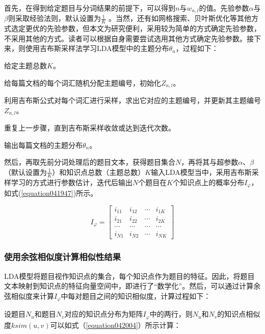 首先，在得到给定题目与分词结果的前提下，可以得到$n$与$w_{n,l}$的值。先验参数$\alpha$与$\beta$则采取经验法则，默认设置为$\frac{1}{K}$ 。当然，还有如网格搜索、贝叶斯优化等其他方式选定更优的先验参数，但本文为研究便利，采用较为简单的方式确定先验参数，不采用其他的方式。读者可以根据自身需要尝试选用其他方式确定先验参数。接下来，则使用吉布斯采样法学习LDA模型中的主题分布$\theta _{n}$，过程如下：

\begin{mgAlgorithm}[吉布采样学习LDA模型过程]
    \item 给定主题总数$K$。
    \item 给每篇文档的每个词汇随机分配主题编号，初始化$Z_{n,l}$。
    \item 利用吉布斯公式对每个词汇进行采样，求出它对应的主题编号，并更新其主题编号$Z_{n,l}$。
    \item 重复上一步骤，直到吉布斯采样收敛或达到迭代次数。
    \item 输出每篇文档的主题分布$\theta _{n}$。
\end{mgAlgorithm}

然后，再取先前分词处理后的题目文本，获得题目集合$N$，再将其与超参数$\alpha$、$\beta$（默认设置为$\frac{1}{K}$）和知识点总数（主题总数）$K$输入LDA模型当中，采用吉布斯采样学习的方式进行参数估计，迭代后输出$N$个题目在$K$个知识点上的概率分布$I_{\varphi}$，如式(\ref{equation041947})所示。

\begin{equation}
    \label{equation041947}
    I_{\varphi}=\left[\begin{array}{cccc}
        i_{11} & i_{12} & \cdots & i_{1 K} \\
        i_{21} & i_{22} & \cdots & i_{2 K} \\
        \cdots & \cdots & \cdots & \cdots \\
        i_{N 1} & i_{N 2} & \cdots & i_{N K}
        \end{array}\right]
\end{equation}

\subsubsection{使用余弦相似度计算相似性结果}

LDA模型将题目视作知识点的集合，每个知识点作为题目的特征。因此，将题目文本映射到知识点的特征向量空间中，即进行了“数学化”。然后，可以通过计算余弦相似度来计算$I_{\varphi}$中每对题目之间的知识相似度，计算过程如下：

设题目$N_{u}$和题目$N_{v}$对应的知识点分布为矩阵$I_{\varphi}$中的两行，则$N_{u}$和$N_{v}$的知识点相似度$ksim(u,v)$可以如式（\ref{equation042004}）所示计算：

